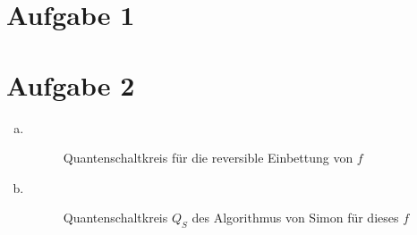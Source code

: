 \documentclass[a4paper]{scrartcl}
\begin{document}
\section*{Aufgabe 1}

\newpage
\section*{Aufgabe 2}
\begin{enumerate}[a)]
\item ~\\
\begin{figure}[htp] 
\caption{Quantenschaltkreis für die reversible Einbettung von $f$}
\end{figure}

\item ~\\
\begin{figure}[htp] 
\caption{Quantenschaltkreis $Q_S$ des Algorithmus von Simon für dieses $f$}
\end{figure}


\end{enumerate}
\end{document}
